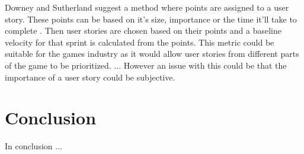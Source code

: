 \documentclass{scrartcl}
\begin{document}

Downey and Sutherland suggest a method where points are assigned to a user story. These points can be based on it's size, importance or the time it'll take to complete \cite{Downey}. Then user stories are chosen based on their points and a baseline velocity for that sprint is calculated from the points. This metric could be suitable for the games industry as it would allow user stories from different parts of the game to be prioritized. ... However an issue with this could be that the importance of a user story could be subjective. 






\section{Conclusion}
In conclusion ...
	


	
\end{document}

